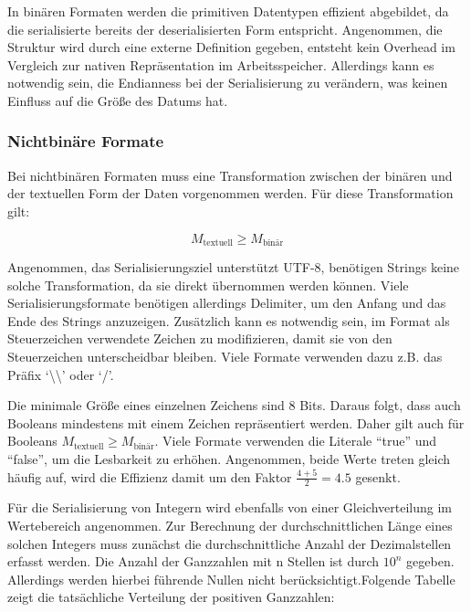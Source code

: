 \documentclass[ngerman]{seminarvorlage}
\begin{document}
In binären Formaten werden die primitiven Datentypen effizient abgebildet, da die serialisierte bereits der deserialisierten Form entspricht. Angenommen, die Struktur wird durch eine externe Definition gegeben, entsteht kein Overhead im Vergleich zur nativen Repräsentation im Arbeitsspeicher. Allerdings kann es notwendig sein, die Endianness bei der Serialisierung zu verändern, was keinen Einfluss auf die Größe des Datums hat.

\subsubsection{Nichtbinäre Formate}

Bei nichtbinären Formaten muss eine Transformation zwischen der binären und der textuellen Form der Daten vorgenommen werden. Für diese Transformation gilt:

$$ M_{\text{textuell}} \geq M_{\text{binär}} $$

Angenommen, das Serialisierungsziel unterstützt UTF-8, benötigen Strings keine solche Transformation, da sie direkt übernommen werden können. Viele Serialisierungsformate benötigen allerdings Delimiter, um den Anfang und das Ende des Strings anzuzeigen. Zusätzlich kann es notwendig sein, im Format als Steuerzeichen verwendete Zeichen zu modifizieren, damit sie von den Steuerzeichen unterscheidbar bleiben. Viele Formate verwenden dazu z.B. das Präfix `\textbackslash\textbackslash' oder `/'.

Die minimale Größe eines einzelnen Zeichens sind 8 Bits. Daraus folgt, dass auch Booleans mindestens mit einem Zeichen repräsentiert werden. Daher gilt auch für Booleans $ M_{\text{textuell}} \geq M_{\text{binär}} $. Viele Formate verwenden die Literale ``true'' und ``false'', um die Lesbarkeit zu erhöhen. Angenommen, beide Werte treten gleich häufig auf, wird die Effizienz damit um den Faktor $\frac{4 + 5}{2} = 4.5$ gesenkt.

Für die Serialisierung von Integern wird ebenfalls von einer Gleichverteilung im Wertebereich angenommen. Zur Berechnung der durchschnittlichen Länge eines solchen Integers muss zunächst die durchschnittliche Anzahl der Dezimalstellen erfasst werden. Die Anzahl der Ganzzahlen mit n Stellen ist durch $10^n$ gegeben. Allerdings werden hierbei führende Nullen nicht berücksichtigt.Folgende Tabelle zeigt die tatsächliche Verteilung der positiven Ganzzahlen:
\end{document}

